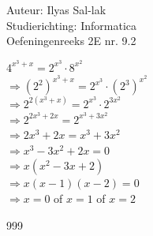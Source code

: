 \documentclass[a4paper]{article}
\begin{document}
\noindent \large Auteur: Ilyas Sal-lak \\
\noindent \large Studierichting: Informatica\\
\noindent \large Oefeningenreeks 2E nr. 9.2\\

\medskip

\normalsize

$4^{x^3+x} = 2^{x^3} \cdot 8^{x^2}$ \\

$\Rightarrow \left(2^2\right)^{x^3+x} = 2^{x^3} \cdot \left(2^3\right)^{x^2}$ \\

$\Rightarrow 2^{2(x^3+x)} = 2^{x^3} \cdot 2^{3x^2}$ \\

$\Rightarrow 2^{2x^3+2x} = 2^{x^3+3x^2}$ \\

$\Rightarrow 2x^3 + 2x = x^3 + 3x^2$ \\

$\Rightarrow x^3 - 3x^2 + 2x = 0$ \\

$\Rightarrow x\left(x^2 - 3x + 2\right)$ \\

$\Rightarrow x(x-1)(x-2) = 0$ \\

$\Rightarrow x = 0$ of $x = 1$ of $x = 2$

\begin{thebibliography}{999}
\end{thebibliography}
\end{document}
